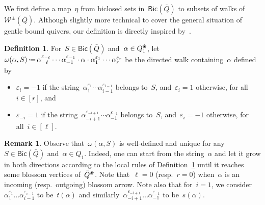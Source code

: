 \documentclass{amsart}
\theoremstyle{definition}
\newtheorem{definition}[theorem]{Definition}
\newtheorem{remark}[theorem]{Remark}
\newcommand{\eqdef}{\mbox{\,\raisebox{0.2ex}{\scriptsize\ensuremath{\mathrm:}}\ensuremath{=}\,}} %
\newcommand{\blossom}{^\text{\ding{96}}} %
\newcommand{\walks}{\mathcal{W}} %
\newcommand{\Bicl}[1]{\mathsf{Bic}(#1)} %
\begin{document}
We first define a map~$\eta$ from biclosed sets in~$\Bicl{\bar Q}$ to subsets of walks of~$\walks^\pm(\bar Q)$.
Although slightly more technical to cover the general situation of gentle bound quivers, our definition is directly inspired by~\cite[Sect.~8]{McConville}.

\begin{definition}
\label{def:fromBiclToNKC}
For~$S \in \Bicl{\bar Q}$ and~$\alpha \in Q_1\blossom$, let
\(
{\omega(\alpha,S) \eqdef \alpha_{-\ell}^{\varepsilon_{-\ell}} \cdots \alpha_{-1}^{\varepsilon_{-1}} \cdot \alpha \cdot \alpha_1^{\varepsilon_1} \cdots \alpha_r^{\varepsilon_r}}
\)
be the directed walk containing~$\alpha$ defined by
\begin{itemize}
\item $\varepsilon_i = -1$ if the string~$\alpha_1^{\varepsilon_1} \cdots \alpha_{i-1}^{\varepsilon_{i-1}}$ belongs to~$S$, and~$\varepsilon_i = 1$ otherwise, for all~$i \in [r]$, and
\item $\varepsilon_{-i} = 1$ if the string~$\alpha_{-i+1}^{\varepsilon_{-i+1}} \cdots \alpha_{-1}^{\varepsilon_{-1}}$ belongs to~$S$, and~$\varepsilon_i = -1$ otherwise, for all~$i \in [\ell]$.
\end{itemize}
\end{definition}

\begin{remark}
Observe that~$\omega(\alpha,S)$ is well-defined and unique for any~$S \in \Bicl{\bar Q}$ and~$\alpha \in Q_1$.
Indeed, one can start from the string~$\alpha$ and let it grow in both directions according to the local rules of Definition~\ref{def:fromBiclToNKC} until it reaches some blossom vertices of~$\bar Q\blossom$.
Note that~$\ell = 0$ (resp.~$r = 0$) when~$\alpha$ is an incoming (resp.~outgoing) blossom arrow.
Note also that for~$i = 1$, we consider $\alpha_1^{\varepsilon_1} \dots \alpha_{i-1}^{\varepsilon_{i-1}}$ to be~$t(\alpha)$ and similarly~$\alpha_{-i+1}^{\varepsilon_{-i+1}} \dots \alpha_{-1}^{\varepsilon_{-1}}$ to be~$s(\alpha)$.
\end{remark}
\end{document}
